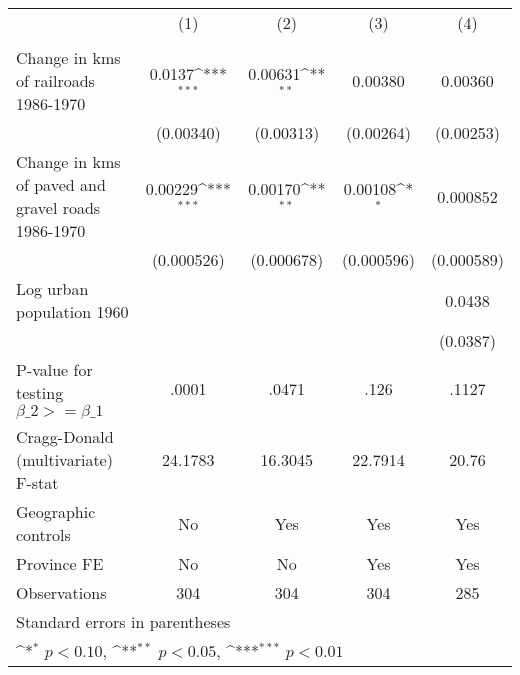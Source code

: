 {
\def\sym#1{\ifmmode^{#1}\else\(^{#1}\)\fi}
\begin{tabular}{l*{4}{c}}
\hline\hline
                &\multicolumn{1}{c}{(1)}&\multicolumn{1}{c}{(2)}&\multicolumn{1}{c}{(3)}&\multicolumn{1}{c}{(4)}\\
                &\multicolumn{1}{c}{}&\multicolumn{1}{c}{}&\multicolumn{1}{c}{}&\multicolumn{1}{c}{}\\
\hline
Change in kms of railroads 1986-1970&   0.0137\sym{***}&  0.00631\sym{**} &  0.00380         &  0.00360         \\
                &(0.00340)         &(0.00313)         &(0.00264)         &(0.00253)         \\
[1em]
Change in kms of paved and gravel roads 1986-1970&  0.00229\sym{***}&  0.00170\sym{**} &  0.00108\sym{*}  & 0.000852         \\
                &(0.000526)         &(0.000678)         &(0.000596)         &(0.000589)         \\
[1em]
Log urban population 1960&                  &                  &                  &   0.0438         \\
                &                  &                  &                  & (0.0387)         \\
\hline
P-value for testing $\beta\_{2} >= \beta\_{1}$&    .0001         &    .0471         &     .126         &    .1127         \\
Cragg-Donald (multivariate) F-stat&  24.1783         &  16.3045         &  22.7914         &    20.76         \\
Geographic controls&       No         &      Yes         &      Yes         &      Yes         \\
Province FE     &       No         &       No         &      Yes         &      Yes         \\
Observations    &      304         &      304         &      304         &      285         \\
\hline\hline
\multicolumn{5}{l}{\footnotesize Standard errors in parentheses}\\
\multicolumn{5}{l}{\footnotesize \sym{*} \(p<0.10\), \sym{**} \(p<0.05\), \sym{***} \(p<0.01\)}\\
\end{tabular}
}

